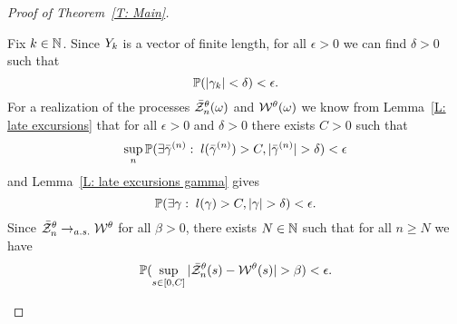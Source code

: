 \begin{proof}[Proof of Theorem~\ref{T: Main}]
\begin{proofpart}
	Fix $k \in \mathbb{N}$. 
	Since ${Y}_k$ is a vector of finite length, for all $\epsilon > 0$ we can find $\delta > 0$ such that
	\begin{equation} \label{E: folk theorem cond bm1}
		\mathbb{P}(|\gamma_k| < \delta) < \epsilon.
	\end{equation}
	For a realization of the processes $\bar{\mathcal{Z}}^{\theta}_n(\omega)$ and $\mathcal{W}^{\theta}(\omega)$ we know from Lemma~\ref{L: late excursions}
	that for all $\epsilon> 0$ and $\delta > 0$ there exists $C > 0$ such that
	\begin{equation} \label{E: folk theorem cond znt}
		\sup_n \mathbb{P}( \exists \bar{\gamma}^{(n)}: \; l(\bar{\gamma}^{(n)}) > C, |\bar{\gamma}^{(n)}| > \delta ) < \epsilon
	\end{equation}
	and Lemma~\ref{L: late excursions gamma} gives
	\begin{equation} \label{E: folk theorem cond bm2}
		\mathbb{P}(\exists \gamma: \; l(\gamma) > C, |\gamma| > \delta) < \epsilon.
	\end{equation}
	Since $\bar{\mathcal{Z}}^{\theta}_n \rightarrow_{a.s.} \mathcal{W}^{\theta}$ for all $\beta > 0$, there exists $N \in \mathbb{N}$ such that for all $n \geq N$ we have
	\begin{equation} \label{E: folk theorem cond sup}
		\mathbb{P}( \sup_{s \in [0, C]} |\bar{\mathcal{Z}}^{\theta}_n(s) - \mathcal{W}^{\theta}(s)| > \beta ) < \epsilon.
	\end{equation}
	

\end{proofpart}
\end{proof}
